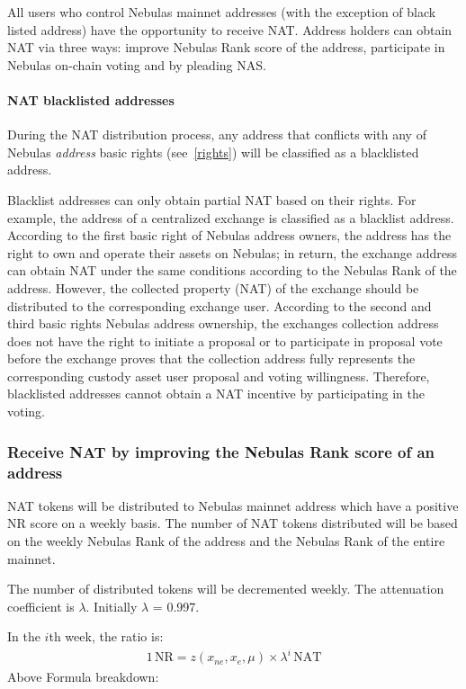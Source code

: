 All users who control Nebulas mainnet addresses (with the exception of black listed address) have the opportunity to receive NAT. Address holders can obtain NAT via three ways: improve Nebulas Rank score of the address, participate in Nebulas on-chain voting and by pleading NAS.


\paragraph{NAT blacklisted addresses}

During the NAT distribution process, any address that conflicts with any of
Nebulas \emph{address} basic rights (see~\ref{rights}) will be classified as a blacklisted address.

Blacklist addresses can only obtain partial NAT based on their rights. For example, the address of a centralized exchange is classified as a blacklist address. According to the first basic right of Nebulas address owners, the address has the right to own and operate their assets on Nebulas; in return, the exchange address can obtain NAT under the same conditions according to the Nebulas Rank of the address. However, the collected property (NAT) of the exchange should be distributed to the corresponding exchange user. According to the second and third basic rights Nebulas address ownership, the exchanges collection address does not have the right to initiate a proposal or to participate in proposal vote before the exchange proves that the collection address fully represents the corresponding custody asset user proposal and voting willingness. Therefore, blacklisted addresses cannot obtain a NAT incentive by participating in the voting.


\subsubsection{Receive NAT by improving the Nebulas Rank score of an address}

NAT tokens will be distributed to Nebulas mainnet address which have a positive NR score on a weekly basis. The number of NAT tokens distributed will be based on the weekly Nebulas Rank of the address and the Nebulas Rank of the entire mainnet.

The number of distributed tokens will be decremented weekly. The attenuation coefficient is $\lambda$. Initially $\lambda$ = 0.997.

In the $i$th week, the ratio is:
\begin{align}
1\,\text{NR}=z(x_{ne},x_{e},\mu)\times\lambda^{i}\,\text{NAT}
\end{align}
Above Formula breakdown:

